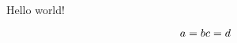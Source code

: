 \documentclass{minimal}
\begin{document}
\begin{flushleft}
  Hello world!
\end{flushleft}

\begin{equation}
  a = b \\
  c = d
\end{equation}
\end{document}
